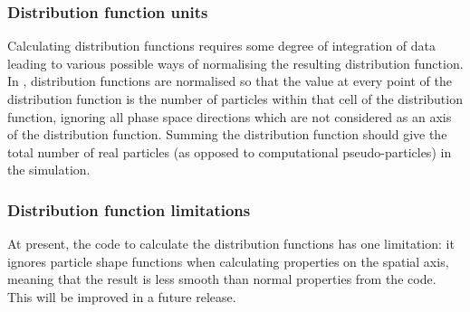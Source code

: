 \documentclass[12pt,a4paper]{article}
\newcommand{\EPOCH}{{\color{warwickdark}\fontfamily{phv}\selectfont{EPOCH}}}
\begin{document}
\subsubsection{Distribution function units}
Calculating distribution functions requires some degree of integration of data
leading to various possible ways of normalising the resulting distribution
function. In {\EPOCH}, distribution functions are normalised so that the value
at every point of the distribution function is the number of particles within
that cell of the distribution function, ignoring all phase space directions
which are not considered as an axis of the distribution function. Summing the
distribution function should give the total number of real particles
(as opposed to computational pseudo-particles) in the
simulation.

\subsubsection{Distribution function limitations}
At present, the code to calculate the distribution functions has one
limitation: it ignores particle shape functions when calculating properties
on the spatial axis, meaning that the result is less smooth than normal
properties from the code. This will be improved in a future release.
\end{document}
